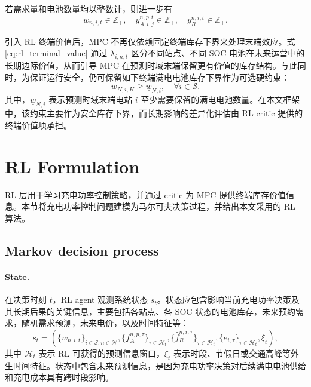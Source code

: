 \documentclass[12pt,hyperref,a4paper,UTF8]{ctexart}
\begin{document}
若需求量和电池数量均以整数计，则进一步有
\begin{equation}
w_{n,i,t}\in \mathbb{Z}_{+},\quad
 y^{n,p,t}_{A,i,j}\in \mathbb{Z}_{+},\quad
 y^{n,i,t}_{R}\in \mathbb{Z}_{+}.
\label{eq:integer}
\end{equation}

引入 RL 终端价值后，MPC 不再仅依赖固定终端库存下界来处理末端效应。式\eqref{eq:rl_terminal_value} 通过 $\lambda_{i,n,t}$ 区分不同站点、不同 SOC 电池在未来运营中的长期边际价值，从而引导 MPC 在预测时域末端保留更有价值的库存结构。与此同时，为保证运行安全，仍可保留如下终端满电电池库存下界作为可选硬约束：
\begin{equation}
w_{N,i,H}\ge \underline{w}_{N,i},
\quad \forall i\in \mathcal{S}.
\label{eq:terminal_inventory}
\end{equation}
其中，$\underline{w}_{N,i}$ 表示预测时域末端电站 $i$ 至少需要保留的满电电池数量。在本文框架中，该约束主要作为安全库存下界，而长期影响的差异化评估由 RL critic 提供的终端价值项承担。

\section{RL Formulation}

RL 层用于学习充电功率控制策略，并通过 critic 为 MPC 提供终端库存价值信息。本节将充电功率控制问题建模为马尔可夫决策过程，并给出本文采用的 RL 算法。

\subsection{Markov decision process}

\paragraph{State.}
在决策时刻 $t$，RL agent 观测系统状态 $s_t$。状态应包含影响当前充电功率决策及其长期后果的关键信息，主要包括各站点、各 SOC 状态的电池库存，未来预约需求，随机需求预测，未来电价，以及时间特征等：
\begin{equation}
s_t=
\left(
\{w_{n,i,t}\}_{i\in\mathcal{S},n\in\mathcal{N}},
\{f_A^{n,p,\tau}\}_{\tau\in\mathcal{H}_t},
\{\hat f_R^{n,i,\tau}\}_{\tau\in\mathcal{H}_t},
\{e_{i,\tau}\}_{\tau\in\mathcal{H}_t},
\xi_t
\right),
\label{eq:rl_state}
\end{equation}
其中 $\mathcal{H}_t$ 表示 RL 可获得的预测信息窗口，$\xi_t$ 表示时段、节假日或交通高峰等外生时间特征。状态中包含未来预测信息，是因为充电功率决策对后续满电电池供给和充电成本具有跨时段影响。
\end{document}
